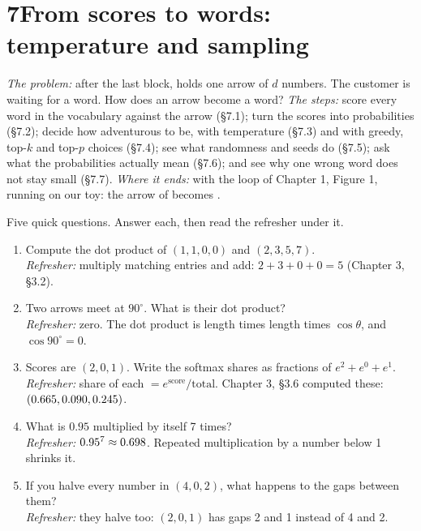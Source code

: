\newpage
\section*{7\quad From scores to words: temperature and sampling}

\begin{chaptermap}
\emph{The problem:} after the last block,  holds one arrow of $d$ numbers. The customer is waiting for a
word. How does an arrow become a word? \emph{The steps:} score every word in the vocabulary against the arrow
(\S7.1); turn the scores into probabilities (\S7.2); decide how adventurous to be, with temperature (\S7.3) and
with greedy, top-$k$ and top-$p$ choices (\S7.4); see what randomness and seeds do (\S7.5); ask what the
probabilities actually mean (\S7.6); and see why one wrong word does not stay small (\S7.7). \emph{Where it
ends:} with the loop of Chapter 1, Figure 1, running on our toy: the arrow of  becomes .
\end{chaptermap}


\begin{beforeyoustart}
Five quick questions. Answer each, then read the refresher under it.
\begin{enumerate}[label=\arabic*.,leftmargin=1.6em]
\item Compute the dot product of $(1,1,0,0)$ and $(2,3,5,7)$.\\
\emph{Refresher:} multiply matching entries and add: $2+3+0+0=5$ (Chapter 3, \S3.2).
\item Two arrows meet at $90^\circ$. What is their dot product?\\
\emph{Refresher:} zero. The dot product is length times length times $\cos\theta$, and $\cos 90^\circ=0$.
\item Scores are $(2,0,1)$. Write the softmax shares as fractions of $e^2+e^0+e^1$.\\
\emph{Refresher:} share of each $=e^{\text{score}}/\text{total}$. Chapter 3, \S3.6 computed these:
$(0.665, 0.090, 0.245)$.
\item What is $0.95$ multiplied by itself 7 times?\\
\emph{Refresher:} $0.95^7\approx0.698$. Repeated multiplication by a number below 1 shrinks it.
\item If you halve every number in $(4,0,2)$, what happens to the gaps between them?\\
\emph{Refresher:} they halve too: $(2,0,1)$ has gaps 2 and 1 instead of 4 and 2.
\end{enumerate}
\end{beforeyoustart}

